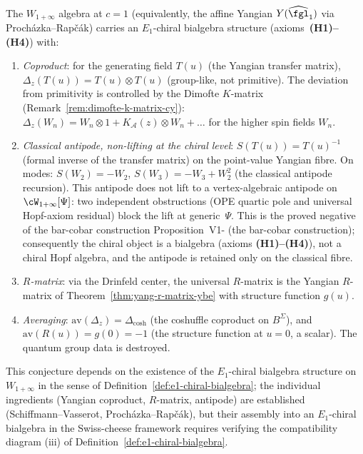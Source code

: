 \begin{conjecture}
\label{conj:w1inf-e1-bialgebra}
\ClaimStatusConjectured
The $W_{1+\infty}$ algebra at $c = 1$ (equivalently, the affine
Yangian $Y(\widehat{\fgl}_1)$ via Proch\'azka--Rap\v{c}\'ak) carries an
$E_1$-chiral bialgebra structure (axioms~\textbf{(H1)--(H4)}) with:
\begin{enumerate}[label=(\roman*)]
 \item \emph{Coproduct}: for the generating field $T(u)$ (the Yangian
 transfer matrix), $\Delta_z(T(u)) = T(u) \otimes T(u)$
 (group-like, not primitive). The deviation from primitivity is
 controlled by the Dimofte $K$-matrix
 (Remark~\ref{rem:dimofte-k-matrix-cy}):
 $\Delta_z(W_n) = W_n \otimes 1 + K_{\mathcal{A}}(z) \otimes W_n + \ldots$
 for the higher spin fields $W_n$.
 \item \emph{Classical antipode, non-lifting at the chiral level}:
 $S(T(u)) = T(u)^{-1}$ (formal inverse of the
 transfer matrix) on the point-value Yangian fibre. On modes:
 $S(W_2) = -W_2$, $S(W_3) = -W_3 + W_2^2$
 (the classical antipode recursion). This antipode does not lift to a
 vertex-algebraic antipode on $\cW_{1+\infty}[\Psi]$: two independent
 obstructions (OPE quartic pole and universal Hopf-axiom residual)
 block the lift at generic~$\Psi$. This is the proved negative of
 the bar-cobar construction Proposition~\textup{V1-\cite{VolI} (the bar-cobar construction)};
 consequently the chiral object is a bialgebra (axioms
 \textbf{(H1)--(H4)}), not a chiral Hopf algebra, and the antipode is
 retained only on the classical fibre.
 \item \emph{$R$-matrix}: via the Drinfeld center,
 the universal $R$-matrix is the Yangian $R$-matrix
 of Theorem~\ref{thm:yang-r-matrix-ybe} with structure function $g(u)$.
 \item \emph{Averaging}: $\mathrm{av}(\Delta_z) = \Delta_{\mathrm{cosh}}$
 (the coshuffle coproduct on $B^{\Sigma}$), and
 $\mathrm{av}(R(u)) = g(0) = -1$ (the structure function at $u = 0$,
 a scalar). The quantum group data is destroyed.
\end{enumerate}
This conjecture depends on the existence of the $E_1$-chiral bialgebra
structure on $W_{1+\infty}$ in the sense of
Definition~\ref{def:e1-chiral-bialgebra}; the individual ingredients
(Yangian coproduct, $R$-matrix, antipode) are established
(Schiffmann--Vasserot, Proch\'azka--Rap\v{c}\'ak), but their assembly into
an $E_1$-chiral bialgebra in the Swiss-cheese framework requires
verifying the compatibility diagram (iii) of
Definition~\ref{def:e1-chiral-bialgebra}.
\end{conjecture}

